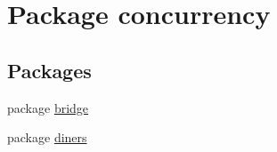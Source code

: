 \hypertarget{namespaceconcurrency}{}\section{Package concurrency}
\label{namespaceconcurrency}
\subsection*{Packages}
\begin{DoxyCompactItemize}
\item 
package \mbox{\hyperlink{namespaceconcurrency_1_1bridge}{bridge}}
\item 
package \mbox{\hyperlink{namespaceconcurrency_1_1diners}{diners}}
\end{DoxyCompactItemize}
